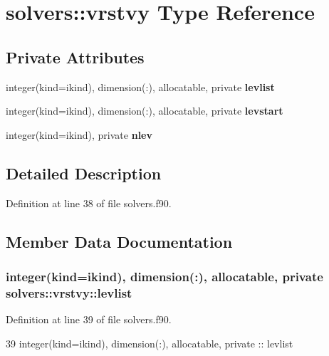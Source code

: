 \section{solvers\+:\+:vrstvy Type Reference}
\label{structsolvers_1_1vrstvy}
\subsection*{Private Attributes}
\begin{DoxyCompactItemize}
\item 
integer(kind=ikind), dimension(\+:), allocatable, private {\bf levlist}
\item 
integer(kind=ikind), dimension(\+:), allocatable, private {\bf levstart}
\item 
integer(kind=ikind), private {\bf nlev}
\end{DoxyCompactItemize}


\subsection{Detailed Description}


Definition at line 38 of file solvers.\+f90.



\subsection{Member Data Documentation}
\subsubsection[{levlist}]{\setlength{\rightskip}{0pt plus 5cm}integer(kind=ikind), dimension(\+:), allocatable, private solvers\+::vrstvy\+::levlist\hspace{0.3cm}{\ttfamily [private]}}\label{structsolvers_1_1vrstvy_ade1f7fc28061646e47cc925d35f1e71a}


Definition at line 39 of file solvers.\+f90.


\begin{DoxyCode}
39         \textcolor{keywordtype}{integer(kind=ikind)}, \textcolor{keywordtype}{dimension(:)}, \textcolor{keywordtype}{allocatable}, \textcolor{keywordtype}{private} :: levlist
\end{DoxyCode}
